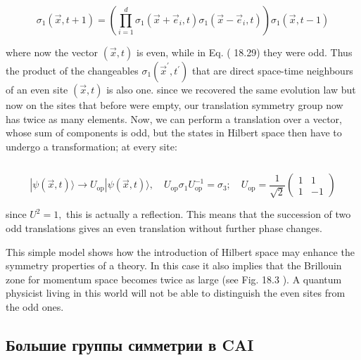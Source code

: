 \documentclass[main.tex]{subfiles}
\begin{document}
\begin{equation}\label{}
	
\end{equation}

$$
\sigma_{1}(\vec{x}, t+1)=\left(\prod_{i=1}^{d} \sigma_{1}\left(\vec{x}+\vec{e}_{i}, t\right) \sigma_{1}\left(\vec{x}-\vec{e}_{i}, t\right)\right) \sigma_{1}(\vec{x}, t-1)
$$

where now the vector $(\vec{x}, t)$ is even, while in Eq. ( 18.29) they were odd. Thus the product of the changeables $\sigma_{1}\left(\vec{x}^{\prime}, t^{\prime}\right)$ that are direct space-time neighbours of an even site $(\vec{x}, t)$ is also one. since we recovered the same evolution law but now on the sites that before were empty, our translation symmetry group now has twice as many elements. Now, we can perform a translation over a vector, whose sum of components is odd, but the states in Hilbert space then have to undergo a transformation; at every site:

\begin{equation}\label{}
	
\end{equation}

$$
|\psi(\vec{x}, t)\rangle \rightarrow U_{\mathrm{op}}|\psi(\vec{x}, t)\rangle, \quad U_{\mathrm{op}} \sigma_{1} U_{\mathrm{op}}^{-1}=\sigma_{3} ; \quad U_{\mathrm{op}}=\frac{1}{\sqrt{2}}\left(\begin{array}{rr}
{1} & {1} \\
{1} & {-1}
\end{array}\right)
$$

since $U^{2}=1,$ this is actually a reflection. This means that the succession of two odd translations gives an even translation without further phase changes.

This simple model shows how the introduction of Hilbert space may enhance the symmetry properties of a theory. In this case it also implies that the Brillouin zone for momentum space becomes twice as large (see Fig. 18.3 ). A quantum physicist living in this world will not be able to distinguish the even sites from the odd ones.


\subsection{Большие группы симметрии в CAI}\label{ch18.3}
\end{document}
